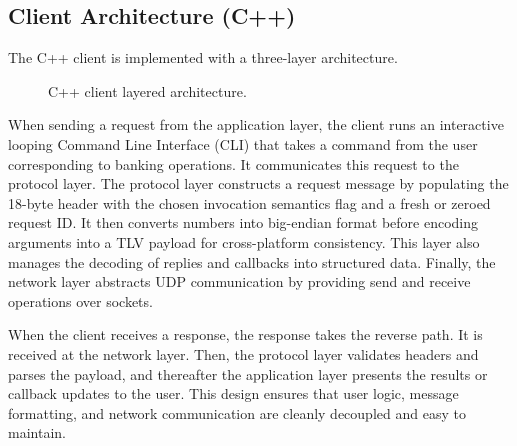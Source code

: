 \documentclass[9pt,a4paper]{article}
\begin{document}
\subsection{Client Architecture (C++)}

The C++ client is implemented with a three-layer architecture.

\begin{figure}[h]
\centering
{}
\caption{C++ client layered architecture.}
\label{fig:cpp-client-architecture}
\end{figure}

When sending a request from the application layer, the client runs an interactive looping Command Line Interface (CLI) that takes a command from the user corresponding to banking operations. It communicates this request to the protocol layer. The protocol layer constructs a request message by populating the 18-byte header with the chosen invocation semantics flag and a fresh or zeroed request ID. It then converts numbers into big-endian format before encoding arguments into a TLV payload for cross-platform consistency. This layer also manages the decoding of replies and callbacks into structured data. Finally, the network layer abstracts UDP communication by providing send and receive operations over sockets.

When the client receives a response, the response takes the reverse path. It is received at the network layer. Then, the protocol layer validates headers and parses the payload, and thereafter the application layer presents the results or callback updates to the user. This design ensures that user logic, message formatting, and network communication are cleanly decoupled and easy to maintain.
\end{document}
